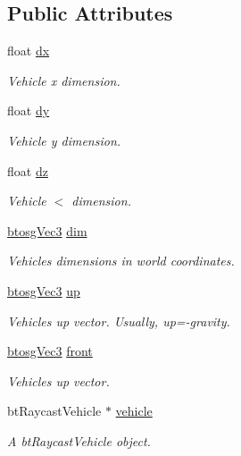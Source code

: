 \subsection*{Public Attributes}
\begin{DoxyCompactItemize}
\item 
float \hyperlink{classbtosgVehicle_aed23010bba3c34158abd4548328b3819}{dx}
\begin{DoxyCompactList}\small\item\em Vehicle x dimension. \end{DoxyCompactList}\item 
float \hyperlink{classbtosgVehicle_ae124e1cd8c424080d7be7c47edb07eb1}{dy}
\begin{DoxyCompactList}\small\item\em Vehicle y dimension. \end{DoxyCompactList}\item 
float \hyperlink{classbtosgVehicle_a39857392dc4882886964c1beefa46268}{dz}
\begin{DoxyCompactList}\small\item\em Vehicle $<$ dimension. \end{DoxyCompactList}\item 
\hyperlink{classbtosgVec3}{btosg\+Vec3} \hyperlink{classbtosgVehicle_a2173f99ca0719929aa5a1c890927aca3}{dim}
\begin{DoxyCompactList}\small\item\em Vehicle\textquotesingle{}s dimensions in world coordinates. \end{DoxyCompactList}\item 
\hyperlink{classbtosgVec3}{btosg\+Vec3} \hyperlink{classbtosgVehicle_a84705afaa9e37bb8a0bd7f6b6f291c26}{up}
\begin{DoxyCompactList}\small\item\em Vehicle\textquotesingle{}s up vector. Usually, up=-\/gravity. \end{DoxyCompactList}\item 
\hyperlink{classbtosgVec3}{btosg\+Vec3} \hyperlink{classbtosgVehicle_a33d6c0dc296ac54ec4a37e34332fa446}{front}
\begin{DoxyCompactList}\small\item\em Vehicle\textquotesingle{}s up vector. \end{DoxyCompactList}\item 
bt\+Raycast\+Vehicle $\ast$ \hyperlink{classbtosgVehicle_ac45b117f8b523f7040de99639deb7522}{vehicle}
\begin{DoxyCompactList}\small\item\em A bt\+Raycast\+Vehicle object. \end{DoxyCompactList}\item 

\end{DoxyCompactItemize}
